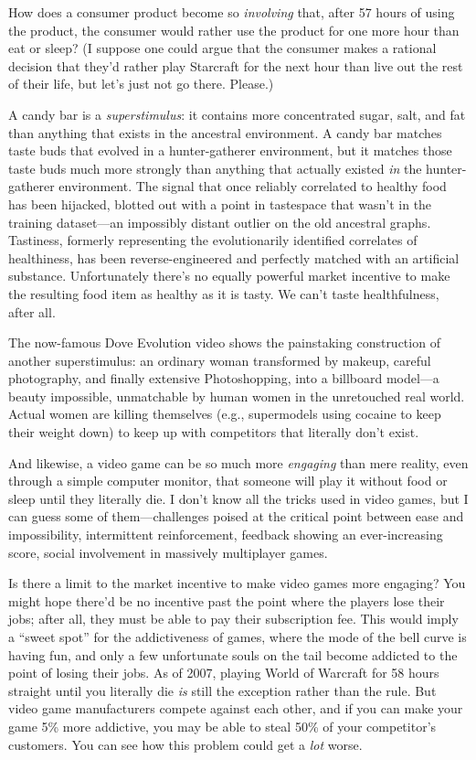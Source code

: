 {
 How does a consumer product become so \textit{involving} that,
after 57 hours of using the product, the consumer would rather use the
product for one more hour than eat or sleep? (I suppose one could argue
that the consumer makes a rational decision that they'd
rather play Starcraft for the next hour than live out the rest of their
life, but let's just not go there. Please.)}

{
 A candy bar is a \textit{superstimulus}: it contains more
concentrated sugar, salt, and fat than anything that exists in the
ancestral environment. A candy bar matches taste buds that evolved in a
hunter-gatherer environment, but it matches those taste buds much more
strongly than anything that actually existed \textit{in} the
hunter-gatherer environment. The signal that once reliably correlated
to healthy food has been hijacked, blotted out with a point in
tastespace that wasn't in the training dataset---an
impossibly distant outlier on the old ancestral graphs. Tastiness,
formerly representing the evolutionarily identified correlates of
healthiness, has been reverse-engineered and perfectly matched with an
artificial substance. Unfortunately there's no equally
powerful market incentive to make the resulting food item as healthy as
it is tasty. We can't taste healthfulness, after all.}

{
 The now-famous Dove Evolution video shows the painstaking
construction of another superstimulus: an ordinary woman transformed by
makeup, careful photography, and finally extensive Photoshopping, into
a billboard model---a beauty impossible, unmatchable by human women in
the unretouched real world. Actual women are killing themselves (e.g.,
supermodels using cocaine to keep their weight down) to keep up with
competitors that literally don't exist.}

{
 And likewise, a video game can be so much more \textit{engaging}
than mere reality, even through a simple computer monitor, that someone
will play it without food or sleep until they literally die. I
don't know all the tricks used in video games, but I
can guess some of them---challenges poised at the critical point
between ease and impossibility, intermittent reinforcement, feedback
showing an ever-increasing score, social involvement in massively
multiplayer games.}

{
 Is there a limit to the market incentive to make video games more
engaging? You might hope there'd be no incentive past
the point where the players lose their jobs; after all, they must be
able to pay their subscription fee. This would imply a
``sweet spot'' for the addictiveness
of games, where the mode of the bell curve is having fun, and only a
few unfortunate souls on the tail become addicted to the point of
losing their jobs. As of 2007, playing World of Warcraft for 58 hours
straight until you literally die \textit{is} still the exception rather
than the rule. But video game manufacturers compete against each other,
and if you can make your game 5\% more addictive, you may be able to
steal 50\% of your competitor's customers. You can see
how this problem could get a \textit{lot} worse.}

